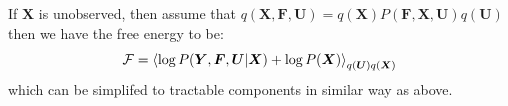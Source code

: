 \begin{remark}
    If $\boldsymbol X$ is unobserved, then assume that $q(\boldsymbol X, \boldsymbol F, \boldsymbol U) = q(\boldsymbol X)P(\boldsymbol F, \boldsymbol X, \boldsymbol U)q(\boldsymbol U)$ then we have the free energy to be:
    \begin{equation*}
        \mathcal{F} = \left\langle \log P(\boldsymbol Y, \boldsymbol F, \boldsymbol U | \boldsymbol X)+ \log P(\boldsymbol X) \right\rangle_{q(\boldsymbol U)q(\boldsymbol X)}
    \end{equation*}
    which can be simplifed to tractable components in similar way as above. 
\end{remark}
